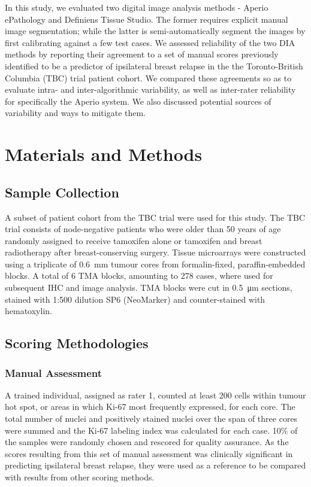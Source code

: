 \documentclass[final,1p,times]{elsarticle}
\begin{document}
In this study, we evaluated two digital image analysis methods - Aperio ePathology and Definiens Tissue Studio. The former requires explicit manual image segmentation; while the latter is semi-automatically segment the images by first calibrating against a few test cases. We assessed reliability of the two DIA methods by reporting their agreement to a set of manual scores previously identified to be a predictor of ipsilateral breast relapse in the the Toronto-British Columbia (TBC) trial patient cohort. \cite{Liu2015} We compared these agreements so as to evaluate intra- and inter-algorithmic variability, as well as inter-rater reliability for specifically the Aperio system. We also discussed potential sources of variability and ways to mitigate them.

\section*{Materials and Methods}

\subsection*{Sample Collection}
A subset of patient cohort from the TBC trial were used for this study. \cite{Liu2015} The TBC trial consists of node-negative patients who were older than 50 years of age randomly assigned to receive tamoxifen alone or tamoxifen and breast radiotherapy after breast-conserving surgery. \cite{Fyles2009} Tissue microarrays were constructed using a triplicate of \SI{0.6}{\milli\metre} tumour cores from formalin-fixed, paraffin-embedded blocks. A total of 6 TMA blocks, amounting to 278 cases, where used for subsequent IHC and image analysis. TMA blocks were cut in \SI{0.5}{\micro\metre} sections, stained with 1:500 dilution SP6 (NeoMarker) and counter-stained with hematoxylin.

\subsection*{Scoring Methodologies}

\subsubsection*{Manual Assessment}
A trained individual, assigned as rater 1, counted at least 200 cells within tumour hot spot, or areas in which Ki-67 most frequently expressed, for each core. The total number of nuclei and positively stained nuclei over the span of three cores were summed and the Ki-67 labeling index was calculated for each case. 10\% of the samples were randomly chosen and rescored for quality assurance. As the scores resulting from this set of manual assessment was clinically significant in predicting ipsilateral breast relapse, they were used as a reference to be compared with results from other scoring methods.
\end{document}
